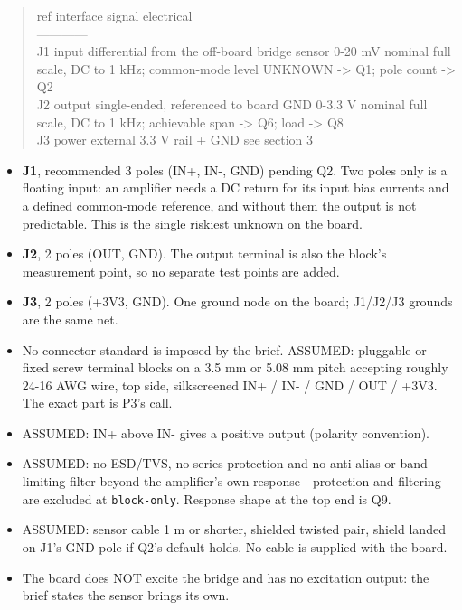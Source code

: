 \documentclass[11pt,a4paper]{article}
\begin{document}
\begin{quote}\small\ttfamily\raggedright
\textbar{} ref \textbar{} interface \textbar{} signal \textbar{} electrical \textbar{}\\
\textbar{}---\textbar{}---\textbar{}---\textbar{}---\textbar{}\\
\textbar{} J1 \textbar{} input \textbar{} differential from the off-board bridge sensor \textbar{} 0-20 mV nominal full scale, DC to 1 kHz; common-mode level UNKNOWN -\textgreater{} Q1; pole count -\textgreater{} Q2 \textbar{}\\
\textbar{} J2 \textbar{} output \textbar{} single-ended, referenced to board GND \textbar{} 0-3.3 V nominal full scale, DC to 1 kHz; achievable span -\textgreater{} Q6; load -\textgreater{} Q8 \textbar{}\\
\textbar{} J3 \textbar{} power \textbar{} external 3.3 V rail + GND \textbar{} see section 3 \textbar{}
\end{quote}
\begin{itemize}
\item \textbf{J1}, recommended 3 poles (IN+, IN-, GND) pending Q2. Two poles only is a
floating input: an amplifier needs a DC return for its input bias currents
and a defined common-mode reference, and without them the output is not
predictable. This is the single riskiest unknown on the board.
\item \textbf{J2}, 2 poles (OUT, GND). The output terminal is also the block's
measurement point, so no separate test points are added.
\item \textbf{J3}, 2 poles (+3V3, GND). One ground node on the board; J1/J2/J3 grounds
are the same net.
\item No connector standard is imposed by the brief. ASSUMED: pluggable or fixed
screw terminal blocks on a 3.5 mm or 5.08 mm pitch accepting roughly 24-16 AWG
wire, top side, silkscreened IN+ / IN- / GND / OUT / +3V3. The exact part is
P3's call.
\item ASSUMED: IN+ above IN- gives a positive output (polarity convention).
\item ASSUMED: no ESD/TVS, no series protection and no anti-alias or band-limiting
filter beyond the amplifier's own response - protection and filtering are
excluded at \texttt{block-only}. Response shape at the top end is Q9.
\item ASSUMED: sensor cable 1 m or shorter, shielded twisted pair, shield landed on
J1's GND pole if Q2's default holds. No cable is supplied with the board.
\item The board does NOT excite the bridge and has no excitation output: the brief
states the sensor brings its own.
\end{itemize}
\end{document}
